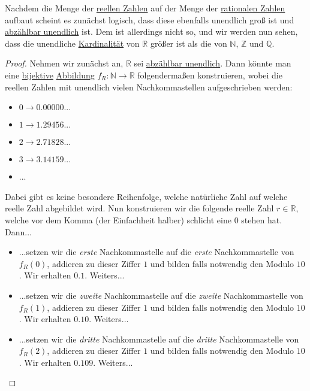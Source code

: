 \documentclass[../../main.tex]{subfiles}
\begin{document}
		\begin{definition}
			\label{def:überabzählbarUnendlich}
			Nachdem die Menge der \hyperref[def:ReelleZahlen]{reellen Zahlen} auf der Menge der \hyperref[def:RationaleZahlen]{rationalen Zahlen} aufbaut scheint es zunächst logisch, dass diese ebenfalls unendlich groß ist und \hyperref[def:abzählbarUnendlich]{abzählbar unendlich} ist. Dem ist allerdings nicht so, und wir werden nun sehen, dass die unendliche \hyperref[def:Kardinalität]{Kardinalität} von $\mathbb{R}$ größer ist als die von $\mathbb{N}$, $\mathbb{Z}$ und $\mathbb{Q}$. 
			\begin{proof}
				Nehmen wir zunächst an, $\mathbb{R}$ sei \hyperref[def:abzählbarUnendlich]{abzählbar unendlich}. Dann könnte man eine \hyperref[def:Bijektiv]{bijektive} \hyperref[def:Abbildung]{Abbildung} $f_R: \mathbb{N} \rightarrow \mathbb{R}$ folgendermaßen konstruieren, wobei die reellen Zahlen mit unendlich vielen Nachkommastellen aufgeschrieben werden:
				\begin{itemize}
					\item $0 \rightarrow 0.00000...$
					\item $1 \rightarrow 1.29456...$
					\item $2 \rightarrow 2.71828...$
					\item $3 \rightarrow 3.14159...$
					\item ...
				\end{itemize}
				Dabei gibt es keine besondere Reihenfolge, welche natürliche Zahl auf welche reelle Zahl abgebildet wird. Nun konstruieren wir die folgende reelle Zahl $r \in \mathbb{R}$, welche vor dem Komma (der Einfachheit halber) schlicht eine $0$ stehen hat. Dann...
				\begin{itemize}
					\item ...setzen wir die \textit{erste} Nachkommastelle auf die \textit{erste} Nachkommastelle von $f_R(0)$, addieren zu dieser Ziffer $1$ und bilden falls notwendig den Modulo $10$. Wir erhalten $0.1$. Weiters...
					\item ...setzen wir die \textit{zweite} Nachkommastelle auf die \textit{zweite} Nachkommastelle von $f_R(1)$, addieren zu dieser Ziffer $1$ und bilden falls notwendig den Modulo $10$. Wir erhalten $0.10$. Weiters...
					\item ...setzen wir die \textit{dritte} Nachkommastelle auf die \textit{dritte} Nachkommastelle von $f_R(2)$, addieren zu dieser Ziffer $1$ und bilden falls notwendig den Modulo $10$. Wir erhalten $0.109$. Weiters...

\end{itemize}
\end{proof}
\end{definition}
\end{document}

